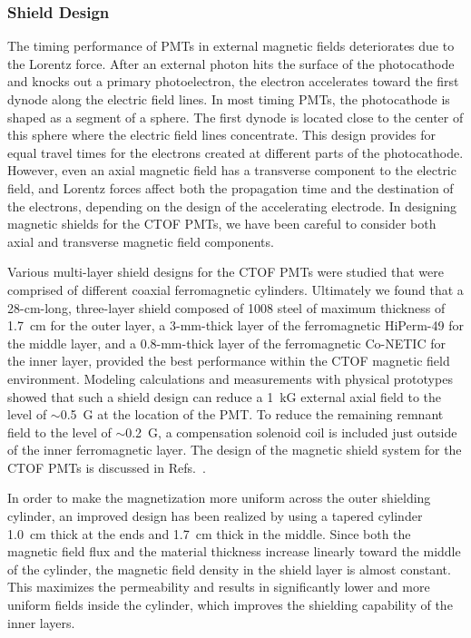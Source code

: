 \documentclass{elsart}
\begin{document}
\subsubsection{Shield Design}

The timing performance of PMTs in external magnetic fields deteriorates due to the Lorentz 
force. After an external photon hits the surface of the photocathode and knocks out a primary 
photoelectron, the electron accelerates toward the first dynode along the electric field lines. 
In most timing PMTs, the photocathode is shaped as a segment of a sphere. The first dynode is 
located close to the center of this sphere where the electric field lines concentrate. This 
design provides for equal travel times for the electrons created at different parts of the 
photocathode. However, even an axial magnetic field has a transverse component to the electric 
field, and Lorentz forces affect both the propagation time and the destination of the electrons, 
depending on the design of the accelerating electrode. In designing magnetic shields for the CTOF 
PMTs, we have been careful to consider both axial and transverse magnetic field components.

Various multi-layer shield designs for the CTOF PMTs were studied that were comprised of different
coaxial ferromagnetic cylinders. Ultimately we found that a 28-cm-long, three-layer shield
composed of 1008 steel of maximum thickness of 1.7~cm for the outer layer, a 3-mm-thick layer 
of the ferromagnetic HiPerm-49 for the middle layer, and a 0.8-mm-thick layer of the 
ferromagnetic Co-NETIC for the inner layer, provided the best performance within the CTOF 
magnetic field environment. Modeling calculations and measurements with physical prototypes 
showed that such a shield design can reduce a 1~kG external axial field to the level of 
$\sim$0.5~G at the location of the PMT. To reduce the remaining remnant field to the level 
of $\sim$0.2~G, a compensation solenoid coil is included just outside of the inner 
ferromagnetic layer. The design of the magnetic shield system for the CTOF PMTs is discussed 
in Refs.~\cite{baturin12,cn2015-003}.

In order to make the magnetization more uniform across the outer shielding cylinder, an 
improved design has been realized by using a tapered cylinder 1.0~cm thick at the ends and 
1.7~cm thick in the middle.  Since both the magnetic field flux and the material thickness 
increase linearly toward the middle of the cylinder, the magnetic field density in the shield 
layer is almost constant. This maximizes the permeability and results in significantly lower 
and more uniform fields inside the cylinder, which improves the shielding capability of the 
inner layers.
\end{document}
